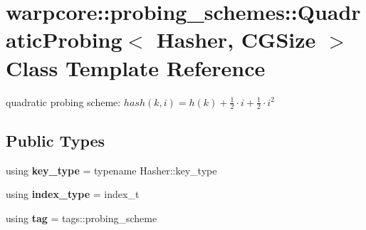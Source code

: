 \hypertarget{classwarpcore_1_1probing__schemes_1_1QuadraticProbing}{}\section{warpcore\+:\+:probing\+\_\+schemes\+:\+:Quadratic\+Probing$<$ Hasher, C\+G\+Size $>$ Class Template Reference}
\label{classwarpcore_1_1probing__schemes_1_1QuadraticProbing}


quadratic probing scheme\+: $hash(k,i) = h(k)+\frac{1}{2}\cdot i+\frac{1}{2}\cdot i^2$  


\subsection*{Public Types}
\begin{DoxyCompactItemize}
\item 
\mbox{\label{classwarpcore_1_1probing__schemes_1_1QuadraticProbing_ad66a4c99e11be13be22a742aa9f502c9}} 
using {\bfseries key\+\_\+type} = typename Hasher\+::key\+\_\+type
\item 
\mbox{\label{classwarpcore_1_1probing__schemes_1_1QuadraticProbing_ad8b8070e3d75f5480261d0beafbfb80d}} 
using {\bfseries index\+\_\+type} = index\+\_\+t
\item 
\mbox{\label{classwarpcore_1_1probing__schemes_1_1QuadraticProbing_a87e96c598403d572a0858a1755dfba50}} 
using {\bfseries tag} = tags\+::probing\+\_\+scheme
\end{DoxyCompactItemize}
